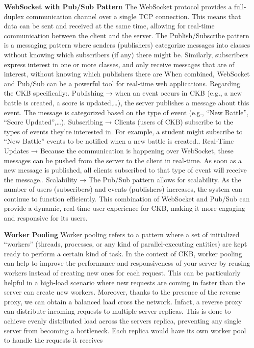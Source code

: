 \textbf{WebSocket with Pub/Sub Pattern}\newline
The WebSocket protocol provides a full-duplex communication channel over a single TCP connection. 
This means that data can be sent and received at the same time, allowing for real-time communication between the client and the server.
The Publish/Subscribe pattern is a messaging pattern where senders (publishers) categorize messages into classes without knowing which 
subscribers (if any) there might be. Similarly, subscribers express interest in one or more classes, and only receive messages that are of interest, 
without knowing which publishers there are
When combined, WebSocket and Pub/Sub can be a powerful tool for real-time web applications. Regarding the CKB specifically:. Publishing → when an event occurs in CKB (e.g., a new battle is created, a score is updated,…), the server publishes a message about this event. 
The message is categorized based on the type of event (e.g., “New Battle”, “Score Updated”,…). Subscribing → Clients (users of CKB) subscribe to the types of events they’re interested in. 
For example, a student might subscribe to “New Battle” events to be notified when a new battle is created.. Real-Time Updates → Because the communication is happening over WebSocket, these messages can be pushed from the 
server to the client in real-time. As soon as a new message is published, all clients subscribed to that type of event will receive the message.. Scalability → The Pub/Sub pattern allows for scalability. As the number of users (subscribers) and events (publishers) increases, 
the system can continue to function efficiently.\newline
This combination of WebSocket and Pub/Sub can provide a dynamic, real-time user experience for CKB, making it more engaging and responsive for its users.

\textbf{Worker Pooling}\newline
Worker pooling refers to a pattern where a set of initialized “workers” (threads, processes, or any kind of parallel-executing entities) 
are kept ready to perform a certain kind of task. In the context of CKB, worker pooling can help to improve the performance and 
responsiveness of your server by reusing workers instead of creating new ones for each request. This can be particularly helpful in 
a high-load scenario where new requests are coming in faster than the server can create new workers. 
Moreover, thanks to the presence of the reverse proxy, we can obtain a balanced load cross the network. 
Infact, a reverse proxy can distribute incoming requests to multiple server replicas. 
This is done to achieve evenly distributed load across the servers replica, 
preventing any single server from becoming a bottleneck. 
Each replica would have its own worker pool to handle the requests it receives

